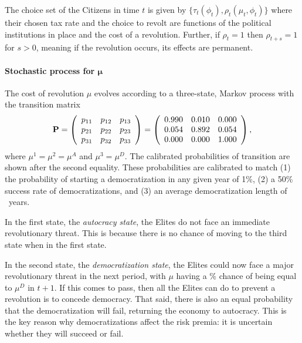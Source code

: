The choice set of the Citizens in time $t$ is given by $\{\tau_t (\phi_t) ,\rho_t (\mu_t, \phi_t)\}$ where their chosen tax rate and the choice to revolt are functions of the political institutions in place and the cost of a revolution. Further, if $\rho_t = 1$ then $\rho_{t+s} = 1$ for $s>0$, meaning if the revolution occurs, its effects are permanent.

\paragraph{Stochastic process for $\boldsymbol \mu$}

The cost of revolution $\mu$ evolves according to a three-state, Markov process with the transition matrix 
\begin{equation}
\mathbf{P}=\left(\begin{array}{lll}
p_{11} & p_{12} & p_{13}\\
p_{21} & p_{22} & p_{23}\\
p_{31} & p_{32} & p_{33}
\end{array}\right)=\left(\begin{array}{lll}
0.990 & 0.010 & 0.000\\
0.054 & 0.892 & 0.054 \\
0.000 & 0.000 & 1.000
\end{array}\right),
\label{eq:transmat}
\end{equation}
where $\mu^{1}=\mu^{2}=\mu^A$ and $\mu^{3}=\mu^{D}$. The calibrated probabilities of transition are shown after the second equality. These probabilities are calibrated to match (1) the probability of starting a democratization in any given year of 1\%, (2) a 50\% success rate of democratizations, and (3) an average democratization length of \demEpisodeLength\ years.  

In the first state, the \textit{autocracy state},  the Elites do not face an immediate revolutionary threat. This is because there is no chance of moving to the third state when in the first state.

In the second state, the \textit{democratization state},  the Elites could now face a major revolutionary threat in the next period, with $\mu$ having a \transPTwoThreePct\% chance of being equal to $\mu^{D}$ in $t+1$. If this comes to pass, then all the Elites can do to prevent a revolution is to concede democracy. That said, there is also an equal probability that the democratization will fail, returning the economy to autocracy.  This is the key reason why democratizations affect the risk premia: it is uncertain whether they will succeed or fail.

